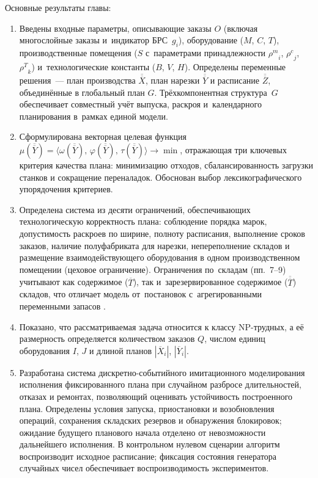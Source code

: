 Основные результаты главы:
\begin{enumerate}
    \item Введены входные параметры, описывающие заказы $O$ (включая многослойные заказы и~индикатор БРС~$g_i$), оборудование ($M$, $C$, $T$), производственные помещения ($S$ с~параметрами принадлежности ${\rho^m}_i$, ${\rho^c}_j$, ${\rho^T}_k$) и~технологические константы ($B$, $V$, $H$).
    Определены переменные решения~--- план производства $\overline{\overline{X}}$, план нарезки $\overline{\overline{Y}}$ и расписание $\overline{\overline{Z}}$, объединённые в глобальный план $G$.
    Трёхкомпонентная структура~$G$ обеспечивает совместный учёт выпуска, раскроя и~календарного планирования в~рамках единой модели.
    \item Сформулирована векторная целевая функция $\mu(\overline{\overline{Y}}) = \langle \omega(\overline{\overline{Y}}),\, \varphi(\overline{\overline{Y}}),\, \tau(\overline{\overline{Y}}) \rangle \to \min$, отражающая три ключевых критерия качества плана: минимизацию отходов, сбалансированность загрузки станков и сокращение переналадок. Обоснован выбор лексикографического упорядочения критериев.
    \item Определена система из десяти ограничений, обеспечивающих технологическую корректность плана: соблюдение порядка марок, допустимость раскроев по ширине, полноту расписания, выполнение сроков заказов, наличие полуфабриката для нарезки, непереполнение складов и размещение взаимодействующего оборудования в одном производственном помещении (цеховое ограничение).
    Ограничения по~складам (пп.~7--9) учитывают как содержимое ($\overline{T}$), так и~зарезервированное содержимое ($\overline{\overline{T}}$) складов, что отличает модель от~постановок с~агрегированными переменными запасов \cite{nonas2000combined,leao2016decomposition}.
    \item Показано, что рассматриваемая задача относится к классу NP-трудных, а её размерность определяется количеством заказов $Q$, числом единиц оборудования $I$, $J$ и длиной планов $|\overline{X}_i|$, $|\overline{Y}_i|$.
    \item Разработана система дискретно-событийного имитационного моделирования исполнения фиксированного плана при случайном разбросе длительностей, отказах и ремонтах, позволяющий оценивать устойчивость построенного плана. Определены условия запуска, приостановки и возобновления операций, сохранения складских резервов и обнаружения блокировок; ожидание будущего планового начала отделено от невозможности дальнейшего исполнения. В контрольном нулевом сценарии алгоритм воспроизводит исходное расписание; фиксация состояния генератора случайных чисел обеспечивает воспроизводимость экспериментов.

\end{enumerate}
